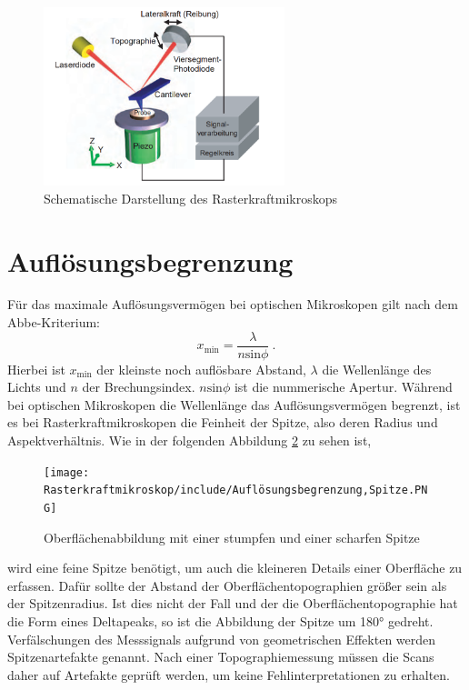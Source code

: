 \begin{figure}[H]
    \centering
    \includegraphics[width=70mm,scale=0.35]{Rasterkraftmikroskop/include/Rasterkraftmikroskop.PNG}
    \caption{Schematische Darstellung des Rasterkraftmikroskops} 
    \label{fig:Rasterkraftmikroskop}
\end{figure}


\section{Auflösungsbegrenzung}
\label{chap:aufloesung}
Für das maximale Auflösungsvermögen bei optischen Mikroskopen gilt nach dem Abbe-Kriterium:
$$x_\text{min}=\frac{\lambda}{n\text{sin}\phi}~.$$
Hierbei ist $x_\text{min}$ der kleinste noch auflösbare Abstand, $\lambda$ die Wellenlänge des Lichts und $n$ der Brechungsindex. $n\text{sin}\phi$ ist die nummerische Apertur. Während bei optischen Mikroskopen die Wellenlänge das Auflösungsvermögen begrenzt, ist es bei Rasterkraftmikroskopen die Feinheit der Spitze, also deren Radius und Aspektverhältnis. Wie in der folgenden Abbildung \ref{fig:Auflösungsbegrenzung,Spitze} zu sehen ist, 
\begin{figure}[H]
    \centering
    \texttt{[image: Rasterkraftmikroskop/include/Auflösungsbegrenzung,Spitze.PNG]}
    \caption{Oberflächenabbildung mit einer stumpfen und einer scharfen Spitze} 
    \label{fig:Auflösungsbegrenzung,Spitze}
\end{figure}
wird eine feine Spitze benötigt, um auch die kleineren Details einer Oberfläche zu erfassen. Dafür sollte der Abstand der Oberflächentopographien größer sein als der Spitzenradius. Ist dies nicht der Fall und der die Oberflächentopographie hat die Form eines Deltapeaks, so ist die Abbildung der Spitze um 180° gedreht. Verfälschungen des Messsignals aufgrund von geometrischen Effekten werden Spitzenartefakte genannt. Nach einer Topographiemessung müssen die Scans daher auf Artefakte geprüft werden, um keine Fehlinterpretationen zu erhalten.


